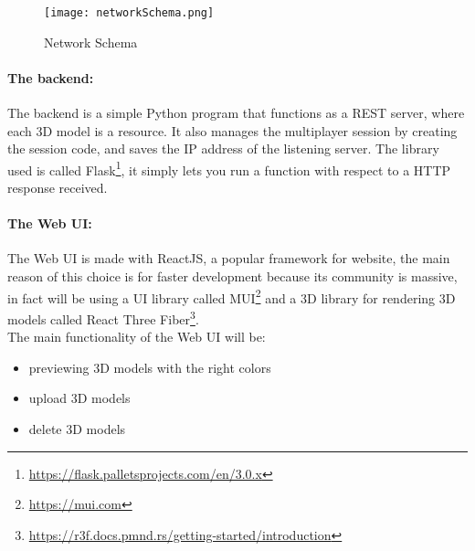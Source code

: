 \begin{figure}[ht]
  \centering
  \texttt{[image: networkSchema.png]}
  \caption{Network Schema}
  \label{fig:NetworkSchema}
\end{figure}


\paragraph{The backend:}
The backend is a simple Python program that functions as a \ac{REST} server, where each 3D model is a resource.
It also manages the multiplayer session by creating the session code, and saves the \ac{IP} address of the listening server.
The library used is called Flask\footnote{\url{https://flask.palletsprojects.com/en/3.0.x}}, it simply lets you run a function with respect to a \ac{HTTP} response received.

\paragraph{The Web UI:}
The Web \ac{UI} is made with ReactJS, a popular framework for website, the main reason of this choice is for faster development because its community is massive, in fact will be using a UI library called MUI\footnote{\url{https://mui.com}}
and a 3D library for rendering 3D models called React Three Fiber\footnote{\url{https://r3f.docs.pmnd.rs/getting-started/introduction}}.\\
The main functionality of the Web \ac{UI} will be:
\begin{itemize}
  \item previewing 3D models with the right colors 
  \item upload 3D models
  \item delete 3D models
\end{itemize}


